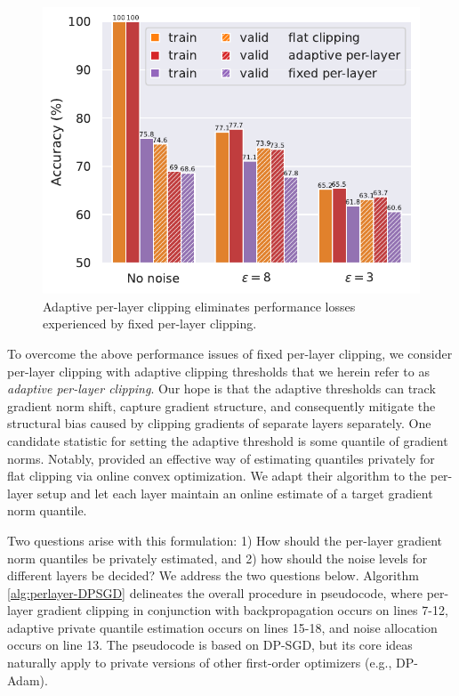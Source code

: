 \begin{figure}
    \centering
    \vspace{-4mm}
    \includegraphics[width=.38\textwidth]{files/fig/cifar_withour_noise_single.pdf}
    \caption{Adaptive per-layer clipping eliminates performance losses experienced by fixed per-layer clipping.}
    \label{fig:cifar_without_noise}
\end{figure}
To overcome the above performance issues of fixed per-layer clipping, we consider per-layer clipping with adaptive clipping thresholds that we herein refer to as \emph{adaptive per-layer clipping}. 
Our hope is that the adaptive thresholds can track gradient norm shift, capture gradient structure, and consequently mitigate the structural bias caused by clipping gradients of separate layers separately. 
One candidate statistic for setting the adaptive threshold is some quantile of gradient norms. 
Notably, \cite{andrew2019differentially} provided an effective way of estimating  quantiles privately for flat clipping via online convex optimization.
We adapt their algorithm to the per-layer setup and let each layer maintain an online estimate of a target gradient norm quantile. %


Two questions arise with this formulation: 1) How should the per-layer gradient norm quantiles be privately estimated, and 2) how should the noise levels for different layers be decided? 
We address the two questions below. 
Algorithm \ref{alg:perlayer-DPSGD} delineates the overall procedure in pseudocode, where per-layer gradient clipping in conjunction with backpropagation occurs on lines 7-12, adaptive private quantile estimation occurs on lines 15-18, and noise allocation occurs on line 13. 
The pseudocode is based on DP-SGD, but its core ideas naturally apply to private versions of other first-order optimizers (e.g., DP-Adam).




